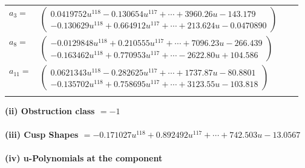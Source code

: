 \documentclass[1p]{elsarticle_modified}
\theoremstyle{definition}
\begin{document}
\begin{tabular}{m{7pt} m{180pt} m{7pt} m{180pt} }
\flushright $a_{3}=$&$\begin{pmatrix}0.0419752 u^{118}-0.130654 u^{117}+\cdots+3960.26 u-143.179\\-0.130629 u^{118}+0.664912 u^{117}+\cdots+213.624 u-0.0470890\end{pmatrix}$ \\
\flushright $a_{8}=$&$\begin{pmatrix}-0.0129848 u^{118}+0.210555 u^{117}+\cdots+7096.23 u-266.439\\-0.163462 u^{118}+0.770953 u^{117}+\cdots-2622.80 u+104.586\end{pmatrix}$ \\
\flushright $a_{11}=$&$\begin{pmatrix}0.0621343 u^{118}-0.282625 u^{117}+\cdots+1737.87 u-80.8801\\-0.135702 u^{118}+0.758695 u^{117}+\cdots+3123.55 u-103.818\end{pmatrix}$\\&\end{tabular}
\flushleft \textbf{(ii) Obstruction class $= -1$}\\~\\
\flushleft \textbf{(iii) Cusp Shapes $= -0.171027 u^{118}+0.892492 u^{117}+\cdots+742.503 u-13.0567$}\\~\\
\newpage\renewcommand{\arraystretch}{1}
\flushleft \textbf{(iv) u-Polynomials at the component}\newline \\
\end{document}
